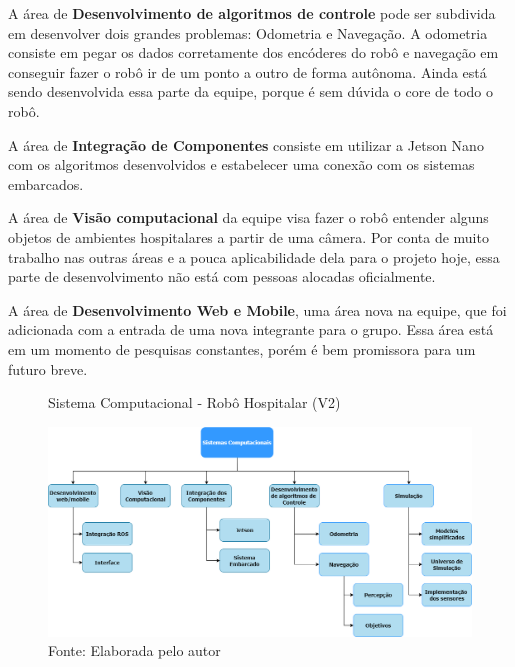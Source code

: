 \documentclass[../poliXuniversity_hospital_(USP)_report.tex]{subfiles}
\begin{document}
A área de \textbf{Desenvolvimento de algoritmos de controle} pode ser subdivida em desenvolver dois grandes problemas: Odometria e Navegação. A odometria consiste em pegar os dados corretamente dos encóderes do robô e navegação em conseguir fazer o robô ir de um ponto a outro de forma autônoma. Ainda está sendo desenvolvida essa parte da equipe, porque é sem dúvida o core de todo o robô.

A área de \textbf{Integração de Componentes} consiste em utilizar a Jetson Nano \cite{jetson21} com os algoritmos desenvolvidos e estabelecer uma conexão com os sistemas embarcados. 

A área de \textbf{Visão computacional} da equipe visa fazer o robô entender alguns objetos de ambientes hospitalares a partir de uma câmera. Por conta de muito trabalho nas outras áreas e a pouca aplicabilidade dela para o projeto hoje, essa parte de desenvolvimento não está com pessoas alocadas oficialmente.

A área de \textbf{Desenvolvimento Web e Mobile}, uma área nova na equipe, que foi adicionada com a entrada de uma nova integrante para o grupo. Essa área está em um momento de pesquisas constantes, porém é bem promissora para um futuro breve.  


\begin{figure}[h]
\centering
    \caption{Sistema Computacional - Robô Hospitalar (V2)}
    \centering %
    \includegraphics[width=17cm]{sistema_computacional.png}
    \caption*{Fonte: Elaborada pelo autor}
    \label{figura:1° Versão Robô Hospitalar}
\end{figure}
\end{document}

